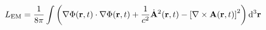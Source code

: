 \documentclass{article}
\begin{document}
\begin{equation}
\begin{split}
L_\mathrm{EM} &= \frac{1}{8\pi}\int\left( \vphantom{\frac{1}{c^2}} \nabla\Phi(\mathbf{r},t)\cdot\nabla\Phi(\mathbf{r},t) + \frac{1}{c^2}\dot{\mathbf{A}}^2(\mathbf{r},t) - \left[\nabla\times\mathbf{A}(\mathbf{r},t)\right]^2\right)\mathrm{d}^3\mathbf{r}\\

\end{split}
\end{equation}
\end{document}
